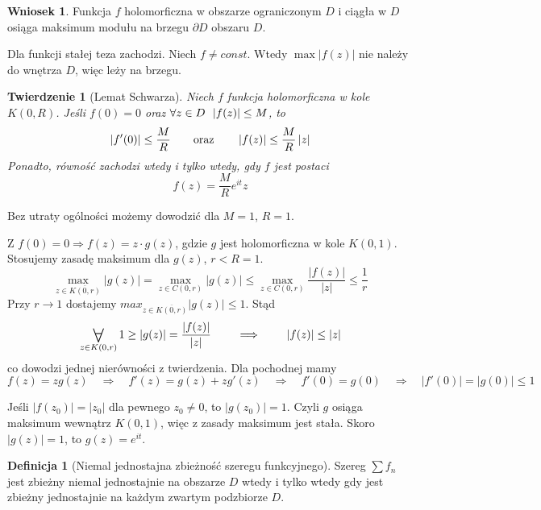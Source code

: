 \documentclass[11pt]{article}
\newcommand{\abs}[1]{\left|#1\right|} %
\newcommand{\closure}[1]{\overline{#1}} %
\newcommand{\Forall}[1]{\mathop{\vcenter{\hbox{\LARGE$\forall$}}}\limits_{#1}} %
\theoremstyle{plain}
\newtheorem*{theorem}{Twierdzenie}
\theoremstyle{definition}
\newtheorem*{definition}{Definicja}
\newtheorem*{corollary}{Wniosek}
\theoremstyle{remark}
\let\oldendproof\endproof
\renewenvironment{proof}[1][\proofname]{
  \oldproof[\textsc{\small #1}]
}{\oldendproof}
\begin{document}
\begin{corollary}
  Funkcja $f$ holomorficzna w obszarze ograniczonym $D$ i ciągła w $D$ osiąga maksimum modułu na brzegu $\partial D$ obszaru $D$.
\end{corollary}

\begin{proof}
  Dla funkcji stałej teza zachodzi.
  Niech $ f \neq const $.
  Wtedy $ \max\abs{f(z)} $ nie należy do wnętrza $D$, więc leży na brzegu.
\end{proof}

\begin{theorem}[Lemat Schwarza]
  Niech $ f $ funkcja holomorficzna w kole $ K(0, R) $.
  Jeśli $ f(0) = 0 $ oraz $ \forall z \in D\enskip\abs{f(z)} \leq M $, to
  $$
    \abs{f'(0)} \leq \frac{M}{R}
    \qquad \textnormal{oraz} \qquad
    \abs{f(z)} \leq \frac{M}{R}\abs{z}
  $$
  Ponadto, równość zachodzi wtedy i tylko wtedy, gdy $ f $ jest postaci
  $$
    f(z) = \frac{M}{R}e^{it}z
  $$
\end{theorem}

\begin{proof}
  Bez utraty ogólności możemy dowodzić dla $ M = 1 $, $ R = 1 $.

  Z $ f(0) = 0 \Rightarrow f(z) = z \cdot g(z) $, gdzie $g$ jest holomorficzna w kole $ K(0,1) $.
  Stosujemy zasadę maksimum dla $ g(z) $, $ r < R = 1 $.
  $$
    \max_{z \in \closure{K(0, r)}} \abs{g(z)} =
    \max_{z \in C(0, r)} \abs{g(z)}
    \leq \max_{z \in C(0, r)} \frac{\abs{f(z)}}{\abs{z}}
    \leq \frac{1}{r}
  $$
  Przy $ r \to 1 $ dostajemy $ max_{z \in \closure{K(0, r)}} \abs{g(z)} \leq 1 $.
  Stąd
  $$
    \Forall{z \in K(0, r)} 1 \geq \abs{g(z)}
    = \frac{\abs{f(z)}}{\abs{z}}
    \qquad \implies \qquad
    \abs{f(z)} \leq \abs{z}
  $$
  co dowodzi jednej nierówności z twierdzenia.
  Dla pochodnej mamy
  $$
    f(z) = zg(z)
    \quad\Rightarrow\quad
    f'(z) = g(z) + zg'(z)
    \quad\Rightarrow\quad
    f'(0) = g(0)
    \quad\Rightarrow\quad
    \abs{f'(0)} = \abs{g(0)}
    \leq 1
  $$

  Jeśli $ \abs{f(z_0)} = \abs{z_0} $ dla pewnego $ z_0 \neq 0 $, to $ \abs{g(z_0)} = 1 $.
  Czyli $ g $ osiąga maksimum wewnątrz $ K(0, 1) $, więc z zasady maksimum jest stała.
  Skoro $ \abs{g(z)} = 1 $, to $ g(z) = e^{it} $.
\end{proof}

\begin{definition}[Niemal jednostajna zbieżność szeregu funkcyjnego]
  Szereg $ \sum f_{n} $ jest zbieżny niemal jednostajnie na obszarze $D$ wtedy i tylko wtedy gdy jest zbieżny jednostajnie na każdym zwartym podzbiorze $D$.
\end{definition}
\end{document}

